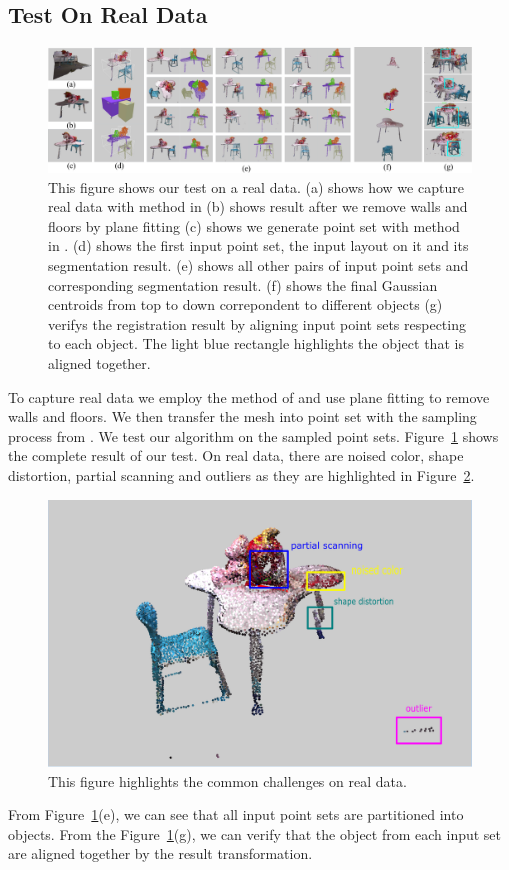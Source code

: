 \subsection{Test On Real Data}
\begin{figure}[htb]
	\centering
	\includegraphics[width=\linewidth]{images/realdata/realdata}
	\caption{\label{fig:realdata}This figure shows our test on a real data. (a) shows how we capture real data with method in \cite{VXH} (b) shows result after we remove walls and floors by plane fitting (c) shows we generate point set with method in \cite{PossionSampling}. (d) shows the first input point set, the input layout on it and its segmentation result. (e) shows all other pairs of input point sets and corresponding segmentation result. (f) shows the final Gaussian centroids from top to down correpondent to different objects (g) verifys the registration result by aligning input point sets respecting to each object. The light blue rectangle highlights the object that is aligned together. }
\end{figure}
To capture real data we employ the method of \cite{VXH} and use plane fitting to remove walls and floors. We then transfer the mesh into point set with the sampling process from \cite{PossionSampling}.
We test our algorithm on the sampled point sets. Figure~{\ref{fig:realdata}} shows the complete result of our test. On real data, there are noised color, shape distortion, partial scanning and outliers as they are highlighted in Figure~\ref{fig:challenge}. 
\begin{figure}
	\centering
	\includegraphics[width=\linewidth]{images/challenge/challenge}
	\caption{\label{fig:challenge}This figure highlights the common challenges on real data.}
\end{figure}
From Figure~\ref{fig:realdata}(e), we can see that all input point sets are partitioned into objects. From the Figure~\ref{fig:realdata}(g), we can verify that the object from each input set are aligned together by the result transformation.  
